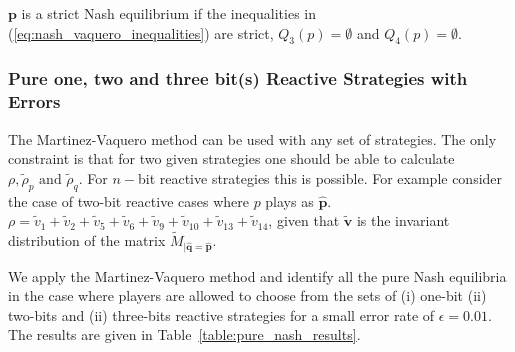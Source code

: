 \documentclass{article}
\theoremstyle{definition}
\begin{document}
\(\mathbf{p}\) is a strict Nash equilibrium if the inequalities in
(\ref{eq:nash_vaquero_inequalities}) are strict, \(Q_3(p) = \emptyset\) and
\(Q_4(p) = \emptyset\).

\subsubsection{Pure one, two and three bit(s) Reactive Strategies with Errors}

The Martinez-Vaquero method can be used with any set of strategies. The only
constraint is that for two given strategies one should be able to calculate
\(\rho, \tilde{\rho}_p \text{ and } \tilde{\rho}_q\).
For \(n-\)bit reactive strategies this is possible. For example consider the
case of two-bit reactive cases where \(p\) plays as \(\mathbf{\hat{p}}\). \(\rho
= \tilde{v}_{1} + \tilde{v}_{2} + \tilde{v}_{5} + \tilde{v}_{6} + \tilde{v}_{9}
+  \tilde{v}_{10} + \tilde{v}_{13} + \tilde{v}_{14}\), given that
\(\mathbf{\tilde{v}}\) is the invariant distribution of the matrix
\(\tilde{M}_{|\mathbf{\hat{q}}=\mathbf{\hat{p}}}\).

We apply the Martinez-Vaquero method and identify all the pure Nash equilibria in the case where
players are allowed to choose from the sets of (i) one-bit (ii) two-bits and
(ii) three-bits reactive strategies for a small error rate of \(\epsilon=0.01\).
The results are given in Table~\ref{table:pure_nash_results}.
\end{document}
